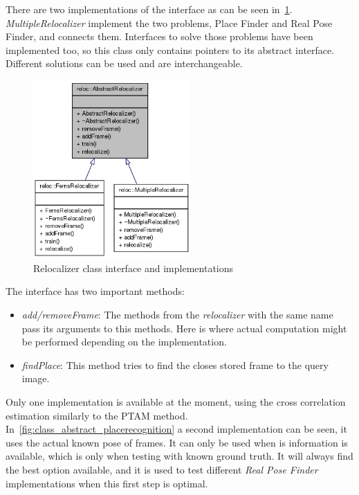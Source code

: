 There are two implementations of the interface as can be seen in~\ref{fig:abstract_classreloc}. \textit{MultipleRelocalizer} implement the two problems, Place Finder and Real Pose Finder, and connects them. Interfaces to solve those problems have been implemented too, so this class only contains pointers to its abstract interface. Different solutions can be used and are interchangeable. \\

\begin{figure}[htpb]
  \centering
  \includegraphics[width=6cm]{img/class_abstractreloc.png}
  \caption{Relocalizer class interface and implementations}
  \label{fig:abstract_classreloc}
\end{figure}

The  interface has two important methods:

\begin{itemize}
  \item \textit{add/removeFrame}: The methods from the \textit{relocalizer} with the same name pass its arguments to this methods. Here is where actual computation might be performed depending on the implementation.
  \item \textit{findPlace}: This method tries to find the closes stored frame to the query image.
\end{itemize}


Only one implementation is available at the moment, using the cross correlation estimation similarly to the PTAM method. In~\ref{fig:class_abstract_placerecognition} a second implementation can be seen, it uses the actual known pose of frames. It can only be used when is information is available, which is only when testing with known ground truth. It will always find the best option available, and it is used to test different \textit{Real Pose Finder} implementations when this first step is optimal. \\

